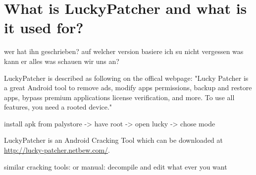 \section{What is LuckyPatcher and what is it used for?}\label{section:luckypatcher-explain}
wer hat ihn geschrieben?\newline
auf welcher version basiere ich\newline
su nicht vergessen\newline
was kann er alles\newline
was schauen wir uns an?\newline

LuckyPatcher is described as following on the offical webpage: "Lucky Patcher is a great Android tool to remove ads, modify apps permissions, backup and restore apps, bypass premium applications license verification, and more. To use all features, you need a rooted device." \cite{luckyPatcherOfficial}

install apk from palystore -> have root -> open lucky -> chose mode

LuckyPatcher is an Android Cracking Tool which can be downloaded at \url{http://lucky-patcher.netbew.com/}.

similar cracking tools:\newline
or manual: decompile and edit what ever you want \newline

